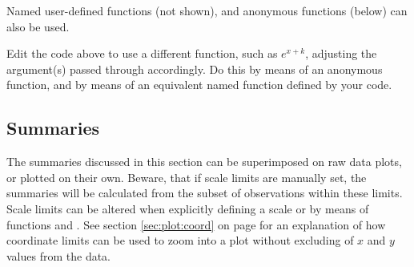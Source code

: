 \documentclass[krantz2]{krantz}\usepackage{knitr}
\begin{document}
Named user-defined functions (not shown), and anonymous functions (below) can also be used.

\begin{knitrout}\footnotesize
{}\color{fgcolor}\begin{kframe}
\begin{alltt}
\hlstd{(} \hlstd{=} \hlstd{(} \hlstd{=} \hlopt{:}\hlstd{),}
        \hlstd{=} \hlstd{(}  \hlopt{+}
  \hlstd{(} \hlstd{=} \hlstd{(}\hlstd{,} \hlstd{,}  \hlopt{+}  \hlopt{*} \hlopt{^}\hlstd{\},}
                 \hlstd{=} \hlstd{(} \hlstd{=} \hlstd{,}  \hlstd{=} \hlstd{))}
\end{alltt}
\end{kframe}
\end{knitrout}

\begin{playground}
Edit the code above to use a different function, such as $e^{x + k}$, adjusting the argument(s) passed through  accordingly. Do this by means of an anonymous function, and by means of an equivalent named function defined by your code.
\end{playground}


\subsection{Summaries}\label{sec:plot:stat:summaries}
The summaries discussed in this section can be superimposed on raw data plots, or plotted on their own. Beware, that if scale limits are manually set, the summaries will be calculated from the subset of observations within these limits. Scale limits can be altered when explicitly defining a scale or by means of functions  and . See section \ref{sec:plot:coord} on page \pageref{sec:plot:coord} for an explanation of how coordinate limits can be used to zoom into a plot without excluding of $x$ and $y$ values from the data.
\end{document}
